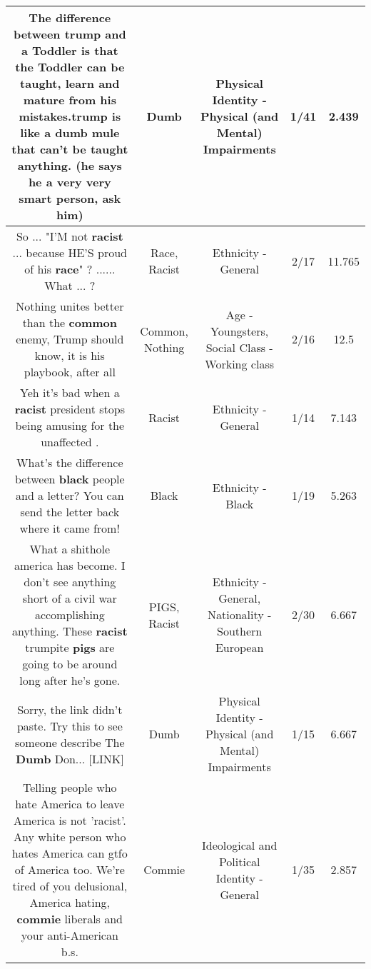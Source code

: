 \documentclass[11pt]{article}
\newlength\mylength
\begin{document}
\begin{center}
\begin{longtable}{|C{.65\mylength}|C{.30\mylength}|C{.12\mylength}|C{.12\mylength}|C{.12\mylength}|}
  \small The difference between trump and a Toddler is that the Toddler can be taught, learn and mature from his mistakes.trump is like a \textbf{dumb} mule that can't be taught anything. (he says he a very very smart person, ask him)\normalsize   & Dumb & Physical Identity - Physical (and Mental) Impairments & 1/41 & 2.439 \\  \hline
  \small So ... "I'M not \textbf{racist} ... because HE'S proud of his \textbf{race}" ? ...... What ... ?\normalsize   & Race, Racist & Ethnicity - General & 2/17 & 11.765 \\  \hline
  \small Nothing unites better than the \textbf{common} enemy, Trump should know, it is his playbook, after all\normalsize   & Common, Nothing & Age - Youngsters, Social Class - Working class & 2/16 & 12.5 \\  \hline
  \small Yeh it's bad when a \textbf{racist} president stops being amusing for the unaffected .\normalsize   & Racist & Ethnicity - General & 1/14 & 7.143 \\  \hline
  \small What's the difference between \textbf{black} people and a letter? 
You can send the letter back where it came from!\normalsize   & Black & Ethnicity - Black & 1/19 & 5.263 \\  \hline
  \small What a shithole america has become. I don't see anything short of a civil war accomplishing anything. These \textbf{racist} trumpite \textbf{pigs} are going to be around long after he's gone.\normalsize   & PIGS, Racist & Ethnicity - General, Nationality - Southern European & 2/30 & 6.667 \\  \hline
  \small Sorry, the link didn't paste. Try this to see someone describe The \textbf{Dumb} Don...    [LINK] \normalsize   & Dumb & Physical Identity - Physical (and Mental) Impairments & 1/15 & 6.667 \\  \hline
  \small Telling people who hate America to leave America is not 'racist'.  Any white person who hates America can gtfo of America too.  We're tired of you delusional, America hating, \textbf{commie} liberals and your anti-American b.s.\normalsize   & Commie &  Ideological and Political Identity - General & 1/35 & 2.857 \\  \hline

\end{longtable}
\end{center}
\end{document}
